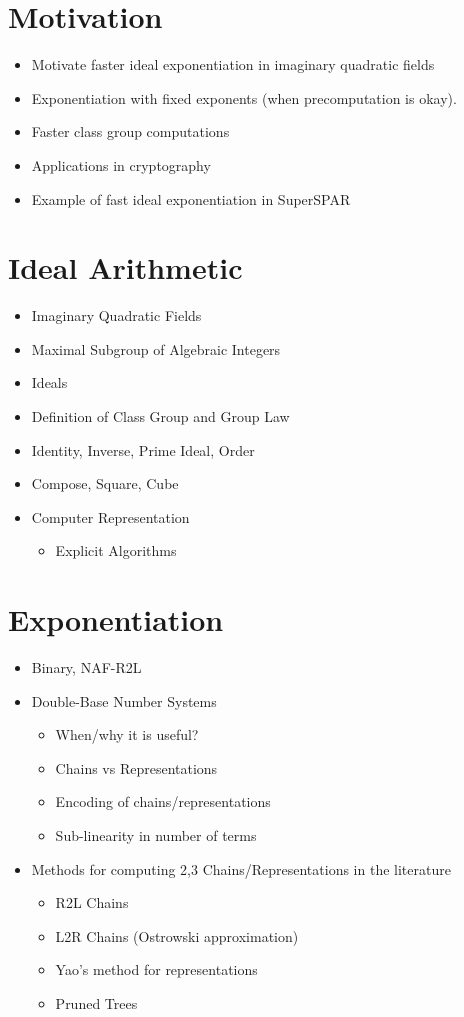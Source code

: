 \documentclass[11pt, letterpaper]{article}
\theoremstyle{definition}
\begin{document}
\section{Motivation}
\begin{itemize}
\item Motivate faster ideal exponentiation in imaginary quadratic fields
\item Exponentiation with fixed exponents (when precomputation is okay).
\item Faster class group computations
\item Applications in cryptography
\item Example of fast ideal exponentiation in SuperSPAR
\end{itemize}


\bigbreak
\section{Ideal Arithmetic}
\begin{itemize}
\item Imaginary Quadratic Fields
\item Maximal Subgroup of Algebraic Integers
\item Ideals
\item Definition of Class Group and Group Law
\item Identity, Inverse, Prime Ideal, Order
\item Compose, Square, Cube
\item Computer Representation
	\begin{itemize}
	\item Explicit Algorithms
	\end{itemize}
\end{itemize}

\bigbreak
\section{Exponentiation}
\begin{itemize}
\item Binary, NAF-R2L
\item Double-Base Number Systems
	\begin{itemize}
	\item When/why it is useful?
	\item Chains vs Representations
	\item Encoding of chains/representations
	\item Sub-linearity in number of terms
	\end{itemize}
\item Methods for computing 2,3 Chains/Representations in the literature
	\begin{itemize}
	\item R2L Chains
	\item L2R Chains (Ostrowski approximation)
	\item Yao's method for representations
	\item Pruned Trees
	\end{itemize}
\end{itemize}
\end{document}

